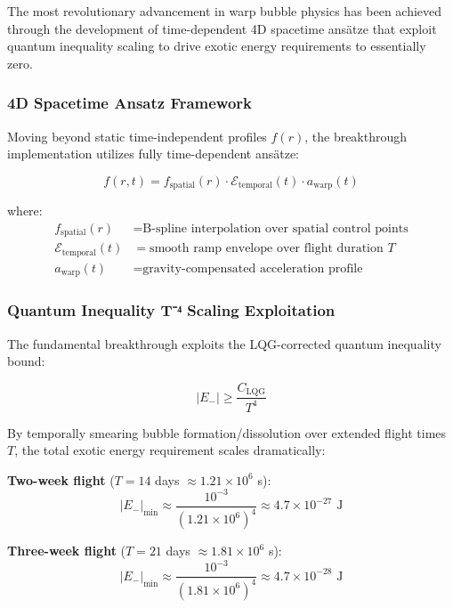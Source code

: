 \documentclass[12pt,a4paper]{article}
\begin{document}
The most revolutionary advancement in warp bubble physics has been achieved through the development of time-dependent 4D spacetime ansätze that exploit quantum inequality scaling to drive exotic energy requirements to essentially zero.

\subsubsection{4D Spacetime Ansatz Framework}

Moving beyond static time-independent profiles $f(r)$, the breakthrough implementation utilizes fully time-dependent ansätze:

\begin{equation}
f(r,t) = f_{\text{spatial}}(r) \cdot \mathcal{E}_{\text{temporal}}(t) \cdot a_{\text{warp}}(t)
\end{equation}

where:
\begin{align}
f_{\text{spatial}}(r) &= \text{B-spline interpolation over spatial control points} \\
\mathcal{E}_{\text{temporal}}(t) &= \text{smooth ramp envelope over flight duration } T \\
a_{\text{warp}}(t) &= \text{gravity-compensated acceleration profile}
\end{align}

\subsubsection{Quantum Inequality T⁻⁴ Scaling Exploitation}

The fundamental breakthrough exploits the LQG-corrected quantum inequality bound:

\begin{equation}
|E_-| \geq \frac{C_{\text{LQG}}}{T^4}
\end{equation}

By temporally smearing bubble formation/dissolution over extended flight times $T$, the total exotic energy requirement scales dramatically:

\textbf{Two-week flight} ($T = 14$ days $\approx 1.21 \times 10^6$ s):
\begin{equation}
|E_-|_{\min} \approx \frac{10^{-3}}{(1.21 \times 10^6)^4} \approx 4.7 \times 10^{-27} \text{ J}
\end{equation}

\textbf{Three-week flight} ($T = 21$ days $\approx 1.81 \times 10^6$ s):
\begin{equation}
|E_-|_{\min} \approx \frac{10^{-3}}{(1.81 \times 10^6)^4} \approx 4.7 \times 10^{-28} \text{ J}
\end{equation}
\end{document}

